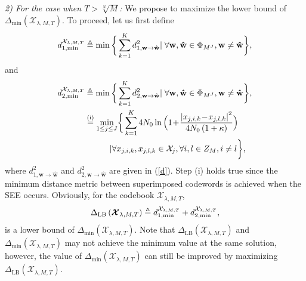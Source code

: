 \documentclass[journal]{IEEEtran}
\begin{document}
\textit{ 2) For the case when $ T>{\sqrt[N]{M}}$:}  We propose to maximize the lower bound of  $\Delta_{\min}\left( {   \boldsymbol {\mathcal X}_{\lambda,M,T}      }\right) $. To proceed, let us first define 
\begin{equation} 
  \small
 \label{delta2}
 d_{1, \min}^{   \mathbf {\mathcal X}_{\lambda,M,T}}  \triangleq     \min \bigg\{   \sum \limits _{k=1}^K  d_{1, \mathbf{w} \to \mathbf{\hat w} }^2  \vert \;    \forall   {{\mathbf{w}}},{{\mathbf{ \hat w}} }\in {\Phi }_{M^J}, 
     {\mathbf{ w}\ne \mathbf{\hat w} } \bigg\}   ,
  \end{equation}
and 
\begin{equation} 
  \small
 \label{delta3}
 \begin{aligned}
 d_{2, \min}^{   \mathbf {\mathcal X}_{\lambda,M,T}} & \triangleq     \min \bigg\{   \sum \limits _{k=1}^K  d_{2, \mathbf{w} \to \mathbf{\hat w} }^2  \vert \;    \forall  {{\mathbf{w}}},{{\mathbf{ \hat w}} }\in {\Phi }_{M^J}, 
     {\mathbf{ w}\ne \mathbf{\hat w} }  \bigg\}, \\
  &  \overset{(\mathrm i)}{=}  \underset {1 \leq j \leq J}{\min}  \bigg\{ \sum \limits _{k=1}^K  { 4N_0   \ln \Big(1\!  +  \! \frac{{ \left| x_{j,i,k} \!  -  \! x_{j,l,k}\right|^2   }  }{4N_0 \left(  1+    \kappa\right)}   \Big)}  \\
& \quad \quad  \quad    | \forall   x_{j,i,k}, x_{j,l,k} \in \mathbf {\mathcal X}_j ,   \forall i,l\in  {Z}_{M} ,   i \neq l \bigg\},
 \end{aligned}
  \end{equation}
where $   d_{1, \mathbf{w} \to \mathbf{\hat w} }^2$ and  $   d_{2, \mathbf{w} \to \mathbf{\hat w} }^2$ are given in (\ref{d}).   Step (i) holds true since the minimum distance metric between superimposed codewords   is achieved when the SEE occurs.  Obviously, for the  codebook  ${   \boldsymbol {\mathcal X}_{\lambda,M,T}}$,  
\begin{equation}
\small
     \Delta_{\text{LB}}\left( {   \boldsymbol {\mathcal X}_{\lambda,M,T}      }\right)  \triangleq d_{1, \min}^{   \mathbf {\mathcal X}_{\lambda,M,T}} + d_{2, \min}^{   \mathbf {\mathcal X}_{\lambda,M,T}},
\end{equation}
is a lower bound of  $\Delta_{\min}\left( {   \boldsymbol {\mathcal X}_{\lambda,M,T}      }\right) $.   Note that   $\Delta_{\text{LB}}\left( {   \boldsymbol {\mathcal X}_{\lambda,M,T}      }\right)$  and  $\Delta_{\min}\left( {   \boldsymbol {\mathcal X}_{\lambda,M,T}      }\right) $ may not achieve the minimum value at the same   solution, however,  the value of $\Delta_{\min}\left( {   \boldsymbol {\mathcal X}_{\lambda,M,T}      }\right) $ can still be improved by maximizing  $\Delta_{\text{LB}}\left( {   \boldsymbol {\mathcal X}_{\lambda,M,T}      }\right)$.
\end{document}
